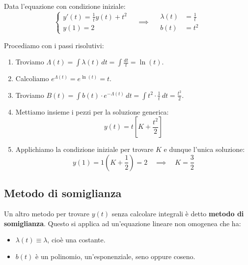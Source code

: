 \documentclass[12pt]{report}
\begin{document}
	\begin{osservazione}{}{}
		
		Data l'equazione con condizione iniziale:
		\[
		\begin{cases}
			y'(t) = \frac{1}{t} y(t) + t^2 \\
			y(1) = 2
		\end{cases}
		\quad \implies \quad
		\begin{aligned}
			\lambda(t) &= \frac{1}{t} \\
			b(t) &= t^2
		\end{aligned}
		\]
		
		Procediamo con i passi risolutivi:
		\begin{enumerate}
			
			\item Troviamo $\Lambda(t) = \int \lambda(t) \, dt = \int \frac{dt}{t} = \ln(t)$.
			
			\item Calcoliamo $e^{\Lambda(t)} = e^{\ln(t)} = t$.
			
			\item Troviamo $B(t) = \int b(t) \cdot e^{-\Lambda(t)} \, dt = \int t^2 \cdot \frac{1}{t} \, dt = \frac{t^2}{2}$.
			
			\item Mettiamo insieme i pezzi per la soluzione generica:
			\[
			y(t) = t \left[ K + \frac{t^2}{2} \right]
			\]
			
			\item Applichiamo la condizione iniziale per trovare $K$ e dunque l'unica soluzione:
			\[
			y(1) = 1 \left( K + \frac{1}{2} \right) = 2 \quad \implies \quad K = \frac{3}{2}
			\]
			
		\end{enumerate}
		
	\end{osservazione}
	
	\subsection{Metodo di somiglianza}
	Un altro metodo per trovare $y(t)$ senza calcolare integrali è detto \textbf{metodo di somiglianza}.
	Questo si applica ad un'equazione lineare non omogenea che ha:
	\begin{itemize}
		
		\item $\lambda(t) \equiv \lambda$, cioè una costante.
		
		\item $b(t)$ è un polinomio, un'esponenziale, seno oppure coseno.
		
	\end{itemize}
	
\end{document}
